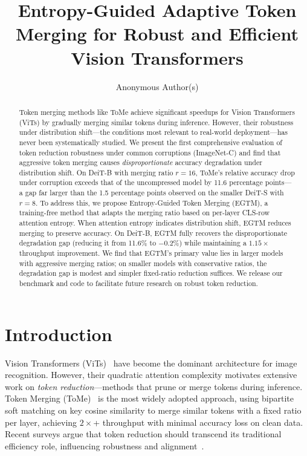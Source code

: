 \documentclass{article}
\title{Entropy-Guided Adaptive Token Merging for Robust and Efficient Vision Transformers}
\author{
  Anonymous Author(s)
}
\newcommand{\ours}{EGTM}
\begin{document}
\maketitle

\begin{abstract}
Token merging methods like ToMe achieve significant speedups for Vision Transformers (ViTs) by gradually merging similar tokens during inference. However, their robustness under distribution shift---the conditions most relevant to real-world deployment---has never been systematically studied. We present the first comprehensive evaluation of token reduction robustness under common corruptions (ImageNet-C) and find that aggressive token merging causes \emph{disproportionate} accuracy degradation under distribution shift. On DeiT-B with merging ratio $r{=}16$, ToMe's relative accuracy drop under corruption exceeds that of the uncompressed model by 11.6 percentage points---a gap far larger than the 1.5 percentage points observed on the smaller DeiT-S with $r{=}8$. To address this, we propose Entropy-Guided Token Merging (\ours{}), a training-free method that adapts the merging ratio based on per-layer CLS-row attention entropy. When attention entropy indicates distribution shift, \ours{} reduces merging to preserve accuracy. On DeiT-B, \ours{} fully recovers the disproportionate degradation gap (reducing it from 11.6\% to $-0.2\%$) while maintaining a $1.15\times$ throughput improvement. We find that \ours{}'s primary value lies in larger models with aggressive merging ratios; on smaller models with conservative ratios, the degradation gap is modest and simpler fixed-ratio reduction suffices. We release our benchmark and code to facilitate future research on robust token reduction.
\end{abstract}

\section{Introduction}

Vision Transformers (ViTs)~\citep{dosovitskiy2021image} have become the dominant architecture for image recognition. However, their quadratic attention complexity motivates extensive work on \emph{token reduction}---methods that prune or merge tokens during inference. Token Merging (ToMe)~\citep{bolya2023token} is the most widely adopted approach, using bipartite soft matching on key cosine similarity to merge similar tokens with a fixed ratio per layer, achieving $2\times$+ throughput with minimal accuracy loss on clean data. Recent surveys argue that token reduction should transcend its traditional efficiency role, influencing robustness and alignment~\citep{kong2025token}.
\end{document}
